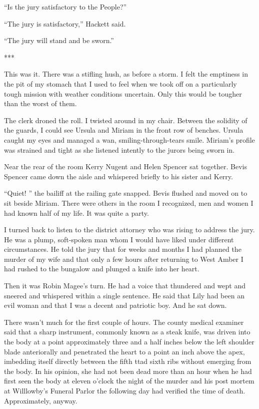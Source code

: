 {“Is the jury satisfactory to the People?”

“The jury is satisfactory,” Hackett said.

“The jury will stand and be sworn.”

***

This was it. There was a stifling hush, as before a storm. I felt the emptiness in the pit of my stomach that I used to feel when we took off on a particularly tough mission with weather conditions uncertain. Only this would be tougher than the worst of them.

The clerk droned the roll. I twisted around in my chair. Between the solidity of the guards, I could see Ursula and Miriam in the front row of benches. Ursula caught my eyes and managed a wan, smiling-through-tears smile. Miriam’s profile was strained and tight as she listened intently to the jurors being sworn in.

Near the rear of the room Kerry Nugent and Helen Spencer sat together. Bevis Spencer came down the aisle and whispered briefly to his sister and Kerry.

“Quiet! ” the bailiff at the railing gate snapped. Bevis flushed and moved on to sit beside Miriam. There were others in the room I recognized, men and women I had known half of my life. It was quite a party.

I turned back to listen to the district attorney who was rising to address the jury. He was a plump, soft-spoken man whom I would have liked under different circumstances. He told the jury that for weeks and months I had planned the murder of my wife and that only a few hours after returning to West Amber I had rushed to the bungalow and plunged a knife into her heart.

Then it was Robin Magee’s turn. He had a voice that thundered and wept and sneered and whispered within a single sentence. He said that Lily had been an evil woman and that I was a decent and patriotic boy. And he sat down.

There wasn’t much for the first couple of hours. The county medical examiner said that a sharp instrument, commonly known as a steak knife, was driven into the body at a point approximately three and a half inches below the left shoulder blade anteriorally and penetrated the heart to a point an inch above the apex, imbedding itself directly between the fifth ttad sixth ribs without emerging from the body. In his opinion, she had not been dead more than an hour when he had first seen the body at eleven o’clock the night of the murder and his post mortem at Willlowby’s Funeral Parlor the following day had verified the time of death. Approximately, anyway.

}
